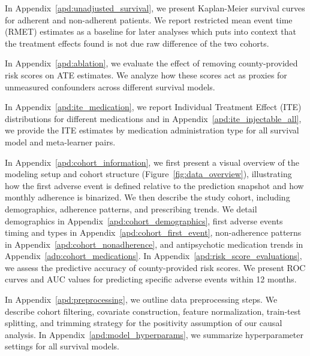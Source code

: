 In Appendix~\ref{apd:unadjusted_survival}, we present Kaplan-Meier survival curves for adherent and non-adherent patients.  
We report restricted mean event time (RMET) estimates as a baseline for later analyses which puts into context that the treatment effects found is not due raw difference of the two cohorts.

In Appendix~\ref{apd:ablation}, we evaluate the effect of removing county-provided risk scores on ATE estimates.  
We analyze how these scores act as proxies for unmeasured confounders across different survival models.  

In Appendix~\ref{apd:ite_medication}, we report Individual Treatment Effect (ITE) distributions for different medications and in Appendix~\ref{apd:ite_injectable_all}, we provide the ITE estimates by medication administration type for all survival model and meta-learner pairs. 

In Appendix~\ref{apd:cohort_information}, we first present a visual overview of the modeling setup and cohort structure (Figure~\ref{fig:data_overview}), illustrating how the first adverse event is defined relative to the prediction snapshot and how monthly adherence is binarized. 
We then describe the study cohort, including demographics, adherence patterns, and prescribing trends.  
We detail demographics in Appendix~\ref{apd:cohort_demographics}, first adverse events timing and types in Appendix~\ref{apd:cohort_first_event},  
non-adherence patterns in Appendix~\ref{apd:cohort_nonadherence}, and antipsychotic medication trends in Appendix~\ref{adp:cohort_medications}.  
In Appendix~\ref{apd:risk_score_evaluations}, we assess the predictive accuracy of county-provided risk scores.  
We present ROC curves and AUC values for predicting specific adverse events within 12 months. 

In Appendix~\ref{apd:preprocessing}, we outline data preprocessing steps.  
We describe cohort filtering, covariate construction, feature normalization, train-test splitting, and trimming strategy for the positivity assumption of our causal analysis.  
In Appendix~\ref{apd:model_hyperparams}, we summarize hyperparameter settings for all survival models.  